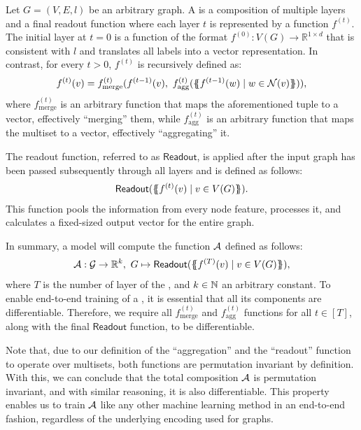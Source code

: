 \begin{definition}\label{def:gnn}
    Let $G = (V, E, l)$ be an arbitrary graph. A \gnn is a composition of multiple layers and a final readout function where each layer $t$ is represented by a function $f^{(t)}$. The initial layer at $t=0$ is a function of the format $f^{(0)}: V(G) \rightarrow \mathbb{R}^{1 \times d}$ that is consistent with $l$ and translates all labels into a vector representation. In contrast, for every $t > 0$, $f^{(t)}$ is recursively defined as:
    \begin{align*}
        f^{(t)}(v) = f^{(t)}_{\text{merge}} (f^{(t-1)}(v), \  f^{(t)}_{\text{agg}}( \{\!\!\{ f^{(t-1)}(w) \mid w \in \mathcal{N}(v) \}\!\!\} )),
    \end{align*}
    where $f^{(t)}_{\text{merge}}$ is an arbitrary function that maps the aforementioned tuple to a vector, effectively ``merging'' them, while $f^{(t)}_{\text{agg}}$ is an arbitrary function that maps the multiset to a vector, effectively ``aggregating'' it.
    
    The readout function, referred to as $\textsf{Readout}$, is applied after the input graph has been passed subsequently through all layers and is defined as follows:
    \begin{align*}
        \textsf{Readout}(\{\!\!\{ f^{(t)}(v) \mid v \in V(G) \}\!\!\}).
    \end{align*}
    This function pools the information from every node feature, processes it, and calculates a fixed-sized output vector for the entire graph.
    
    In summary, a \gnn model will compute the function $\mathcal{A}$ defined as follows:
    \begin{align*}
        \mathcal{A}: \mathcal{G} \rightarrow \mathbb{R}^k, \ G \mapsto \textsf{Readout}(\{\!\!\{ f^{(T)}(v) \mid v \in V(G) \}\!\!\}),
    \end{align*}
    where $T$ is the number of layer of the \gnn, and $k \in \mathbb{N}$ an arbitrary constant. To enable end-to-end training of a \gnn, it is essential that all its components are differentiable. Therefore, we require all $f^{(t)}_{\text{merge}}$ and $f^{(t)}_{\text{agg}}$ functions for all $t \in [T]$, along with the final $\textsf{Readout}$ function, to be differentiable.
\end{definition}
Note that, due to our definition of the ``aggregation'' and the ``readout'' function to operate over multisets, both functions are permutation invariant by definition. With this, we can conclude that the total composition $\mathcal{A}$ is permutation invariant, and with similar reasoning, it is also differentiable. This property enables us to train $\mathcal{A}$ like any other machine learning method in an end-to-end fashion, regardless of the underlying encoding used for graphs. 

